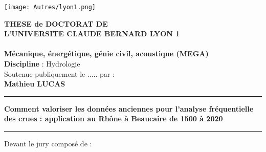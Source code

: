 \thispagestyle{empty}


\vspace*{0.1cm}
\begin{center}
\texttt{[image: Autres/lyon1.png]}
\hfill
\end{center}

\begin{center}
\noindent \large \textbf{THESE de DOCTORAT DE} \\
\noindent \large \textbf{L'UNIVERSITE CLAUDE BERNARD LYON 1} \\
\\
\noindent \normalsize \textbf{Mécanique, énergétique, génie civil, acoustique (MEGA)}\\
\noindent \normalsize \textbf{Discipline} : Hydrologie\\
\noindent \normalsize {Soutenue publiquement le ..... par : \\}
\noindent \large \textbf{Mathieu LUCAS} \\
\hrule
{}
{\LARGE \textbf{Comment valoriser les données anciennes pour l'analyse fréquentielle des crues : application au Rhône à Beaucaire de 1500 à 2020}}
\hrule 
{}
\end{center}
\noindent \normalsize Devant le jury composé de :\\
